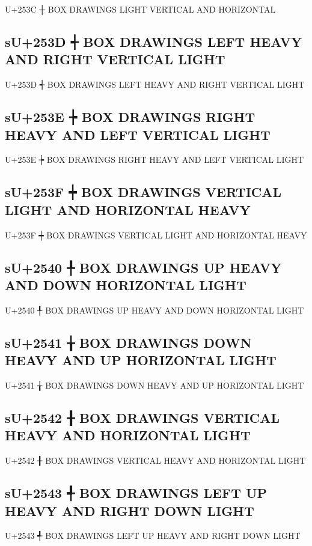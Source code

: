 U+253C ┼ BOX DRAWINGS LIGHT VERTICAL AND HORIZONTAL

\subsection{sU+253D ┽ BOX DRAWINGS LEFT HEAVY AND RIGHT VERTICAL LIGHT}

U+253D ┽ BOX DRAWINGS LEFT HEAVY AND RIGHT VERTICAL LIGHT

\subsection{sU+253E ┾ BOX DRAWINGS RIGHT HEAVY AND LEFT VERTICAL LIGHT}

U+253E ┾ BOX DRAWINGS RIGHT HEAVY AND LEFT VERTICAL LIGHT

\subsection{sU+253F ┿ BOX DRAWINGS VERTICAL LIGHT AND HORIZONTAL HEAVY}

U+253F ┿ BOX DRAWINGS VERTICAL LIGHT AND HORIZONTAL HEAVY

\subsection{sU+2540 ╀ BOX DRAWINGS UP HEAVY AND DOWN HORIZONTAL LIGHT}

U+2540 ╀ BOX DRAWINGS UP HEAVY AND DOWN HORIZONTAL LIGHT

\subsection{sU+2541 ╁ BOX DRAWINGS DOWN HEAVY AND UP HORIZONTAL LIGHT}

U+2541 ╁ BOX DRAWINGS DOWN HEAVY AND UP HORIZONTAL LIGHT

\subsection{sU+2542 ╂ BOX DRAWINGS VERTICAL HEAVY AND HORIZONTAL LIGHT}

U+2542 ╂ BOX DRAWINGS VERTICAL HEAVY AND HORIZONTAL LIGHT

\subsection{sU+2543 ╃ BOX DRAWINGS LEFT UP HEAVY AND RIGHT DOWN LIGHT}

U+2543 ╃ BOX DRAWINGS LEFT UP HEAVY AND RIGHT DOWN LIGHT

